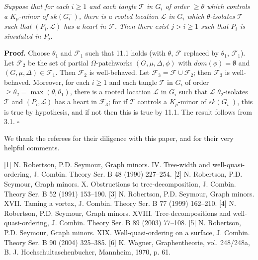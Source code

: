 \textit{Suppose that for each $i \ge 1$ and each tangle $\mathcal{T}$ in $G_i$ of order $\ge \theta$ which controls a $K_p$-minor of $sk(G_i^-)$, there is a rooted location $\mathcal{L}$ in $G_i$ which $\theta$-isolates $\mathcal{T}$ such that $(P_i, \mathcal{L})$ has a heart in $\mathcal{F}$. Then there exist $j > i \ge 1$ such that $P_i$ is simulated in $P_j$.}

\textbf{Proof.} Choose $\theta_1$ and $\mathcal{F}_1$ such that 11.1 holds (with $\theta$, $\mathcal{F}$ replaced by $\theta_1$, $\mathcal{F}_1$). Let $\mathcal{F}_2$ be the set of partial $\Omega$-patchworks $(G, \mu, \Delta, \phi)$ with $dom(\phi) = \emptyset$ and $(G, \mu, \Delta) \in \mathcal{F}_1$. Then $\mathcal{F}_2$ is well-behaved. Let $\mathcal{F}_3 = \mathcal{F} \cup \mathcal{F}_2$; then $\mathcal{F}_3$ is well-behaved. Moreover, for each $i \ge 1$ and each tangle $\mathcal{T}$ in $G_i$ of order $\ge \theta_2 = \max(\theta, \theta_1)$, there is a rooted location $\mathcal{L}$ in $G_i$ such that $\mathcal{L}$ $\theta_2$-isolates $\mathcal{T}$ and $(P_i, \mathcal{L})$ has a heart in $\mathcal{F}_3$; for if $\mathcal{T}$ controls a $K_p$-minor of $sk(G_i^-)$, this is true by hypothesis, and if not then this is true by 11.1. The result follows from 3.1. $\square$


We thank the referees for their diligence with this paper, and for their very helpful comments.


[1] N. Robertson, P.D. Seymour, Graph minors. IV. Tree-width and well-quasi-ordering, J. Combin. Theory Ser. B 48 (1990) 227--254. [2] N. Robertson, P.D. Seymour, Graph minors. X. Obstructions to tree-decomposition, J. Combin. Theory Ser. B 52 (1991) 153--190. [3] N. Robertson, P.D. Seymour, Graph minors. XVII. Taming a vortex, J. Combin. Theory Ser. B 77 (1999) 162--210. [4] N. Robertson, P.D. Seymour, Graph minors. XVIII. Tree-decompositions and well-quasi-ordering, J. Combin. Theory Ser. B 89 (2003) 77--108. [5] N. Robertson, P.D. Seymour, Graph minors. XIX. Well-quasi-ordering on a surface, J. Combin. Theory Ser. B 90 (2004) 325--385. [6] K. Wagner, Graphentheorie, vol. 248/248a, B. J. Hochschultaschenbucher, Mannheim, 1970, p. 61.
